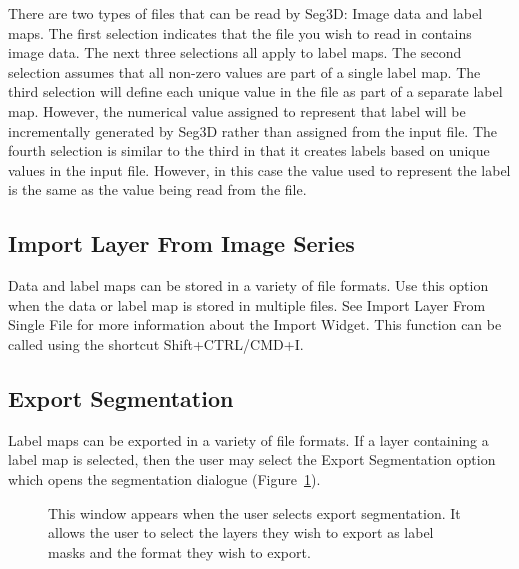 \documentclass[fleqn,11pt,openany]{book}
\begin{document}
There are two types of files that can be read by Seg3D: Image data and label maps.  The first selection indicates that the file you wish to read in contains image data.  The next three selections all apply to label maps.  The second selection assumes that all non-zero values are part of a single label map.  The third selection will define each unique value in the file as part of a separate label map. However, the numerical value assigned to represent that label will be incrementally generated by Seg3D rather than assigned from the input file. The fourth selection is similar to the third in that it creates labels based on unique values in the input file.  However, in this case the value used to represent the label is the same as the value being read from the file.

\subsection{Import Layer From Image Series}
Data and label maps can be stored in a variety of file formats.  Use this option when the data or label map is stored in multiple files. See Import Layer From Single File for more information about the Import Widget. This function can be called using the shortcut Shift+CTRL/CMD+I.

\subsection{Export Segmentation}
Label maps can be exported in a variety of file formats.  If a layer containing a label map is selected, then the user may select the Export Segmentation option which opens the segmentation dialogue (Figure~\ref{fig:ExportSeg}).

\begin{figure}[h!]
\caption{This window appears when the user selects export segmentation.  It allows the user to select the layers they wish to export as label masks and the format they wish to export.}\label{fig:ExportSeg}
\end{figure}
\end{document}
